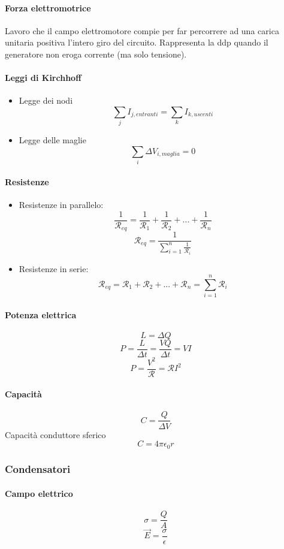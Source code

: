 \documentclass[12pt]{article}
\begin{document}
    \paragraph*{Forza elettromotrice}
    Lavoro che il campo elettromotore compie per far percorrere
    ad una carica unitaria positiva l'intero giro del circuito.
    Rappresenta la ddp quando il generatore non eroga corrente (ma solo tensione).
    \paragraph*{Leggi di Kirchhoff}
    \begin{itemize}
        \item Legge dei nodi \[\sum_{j} I_{j, entranti} = \sum_{k} I_{k, uscenti}\]
        \item Legge delle maglie \[\sum_{i} \Delta V_{i, maglia} = 0\]
    \end{itemize}
    \paragraph*{Resistenze}
    \begin{itemize}
        \item Resistenze in parallelo: \[\frac{1}{\mathcal{R}_{eq}} = \frac{1}{\mathcal{R}_{1}} + \frac{1}{\mathcal{R}_{2}} + ... + \frac{1}{\mathcal{R}_{n}}\]
        \[\mathcal{R}_{eq} = \frac{1}{\sum_{i = 1}^{n}{\frac{1}{\mathcal{R}_i}}}\]
        \item Resistenze in serie: \[\mathcal{R}_{eq} = \mathcal{R}_1 + \mathcal{R}_2 + ... + \mathcal{R}_n = \sum_{i = 1}^{n}{\mathcal{R}_i}\]
    \end{itemize}
    \paragraph*{Potenza elettrica}
    \[L = \Delta Q \]
    \[P = \frac{L}{\Delta t} = \frac{VQ}{\Delta t} = VI\]
    \[P = \frac{V^2}{\mathcal{R}} = \mathcal{R}I^2\]
    \paragraph*{Capacità}
    \[C = \frac{Q}{\Delta V}\]
    Capacità conduttore sferico
    \[C = 4\pi \epsilon_0r\]
    \subsubsection{Condensatori}
    \paragraph*{Campo elettrico}
    \[\sigma = \frac{Q}{A}\]
    \[\vec{E} = \frac{\sigma}{\epsilon}\]
\end{document}
